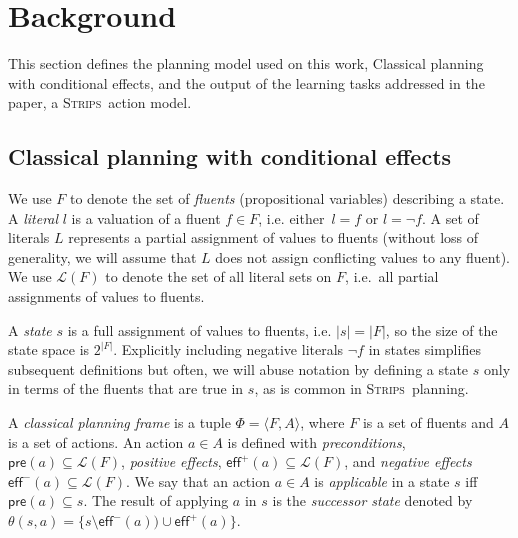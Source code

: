 \documentclass[3p,times]{elsarticle}
\newcommand{\pre}{\mathsf{pre}}  %
\newcommand{\eff}{\mathsf{eff}}  %
\newcommand{\strips}{\textsc{Strips}}     %
\newcommand{\tup}[1]{{\langle #1 \rangle}}
\begin{document}
\section{Background}
\label{sec:Section3}
This section defines the planning model used on this work, Classical planning with conditional effects, and the output of the learning tasks addressed in the paper, a \strips\ action model.

\subsection{Classical planning with conditional effects}
We use $F$ to denote the set of {\em fluents} (propositional variables) describing a state. A {\em literal} $l$ is a valuation of a fluent $f\in F$, i.e. either~$l=f$ or $l=\neg f$. A set of literals $L$ represents a partial assignment of values to fluents (without loss of generality, we will assume that $L$ does not assign conflicting values to any fluent). We use $\mathcal{L}(F)$ to denote the set of all literal sets on $F$, i.e.~all partial assignments of values to fluents.

A {\em state} $s$ is a full assignment of values to fluents, i.e. $|s|=|F|$, so the size of the state space is $2^{|F|}$. Explicitly including negative literals $\neg f$ in states simplifies subsequent definitions but often, we will abuse notation by defining a state $s$ only in terms of the fluents that are true in $s$, as is common in \strips\ planning.

A {\em classical planning frame} is a tuple $\Phi=\tup{F,A}$, where $F$ is a set of fluents and $A$ is a set of actions. An action $a\in A$ is defined with {\em preconditions}, $\pre(a)\subseteq\mathcal{L}(F)$, {\em positive effects}, $\eff^+(a)\subseteq\mathcal{L}(F)$, and {\em negative effects} $\eff^-(a)\subseteq\mathcal{L}(F)$. We say that an action $a\in A$ is {\em applicable} in a state $s$ iff $\pre(a)\subseteq s$. The result of applying $a$ in $s$ is the {\em successor state} denoted by $\theta(s,a)=\{s\setminus\eff^-(a))\cup\eff^+(a)\}$.

\end{document}
